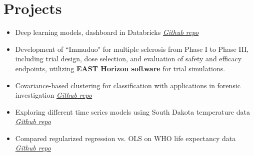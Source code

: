 \documentclass[letterpaper,11pt]{article}
\newcommand{\resumeItem}[2]{
  \item[]\normalsize{
    {#1}{ #2 \vspace{-2pt}}
  }
}
\newcommand{\resumeSubItem}[2]{\resumeItem{#1}{#2}\vspace{-4pt}}
\newcommand{\resumeSubHeadingListStart}{\begin{itemize}[leftmargin=0pt]}
\newcommand{\resumeSubHeadingListEnd}{\end{itemize}}
\begin{document}
\section{Projects}
\resumeSubHeadingListStart
\item Deep learning models, dashboard in Databricks \href{https://github.com/TheoAnim/Databricks-}{\textit{Github repo}} \vspace{-8pt}
\item Development of ``Immuduo" for multiple sclerosis from Phase I to Phase III, including trial design, dose selection, and evaluation of safety and efficacy endpoints, utilizing \textbf{EAST Horizon software} for trial simulations. \vspace{-8pt}
\item Covariance-based clustering for classification with applications in forensic investigation \href{https://github.com/TheoAnim/Clustering-and-Classification}{\textit{Github repo}}\vspace{-9pt}
\item Exploring different time series models using South Dakota temperature data \href{https://github.com/TheoAnim/Time-Series-Project/blob/main/README.md}{\textit{Github repo}}\vspace{-10pt}
\item Compared regularized regression vs. OLS on WHO life expectancy  data {\href{https://github.com/TheoAnim/-Modeling-Life-Expectancy}{\textit{Github repo}}}
\resumeSubHeadingListEnd
\end{document}
